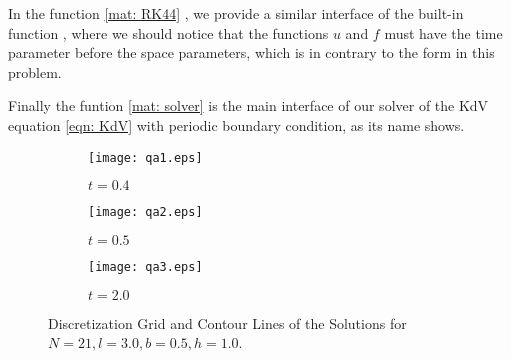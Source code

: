 \documentclass{assignment}[2019/10/15]
\begin{document}

    In the function \ref{mat: RK44} , we provide a similar interface of the built-in function , where we should notice that the functions $u$ and $f$ must have the time parameter before the space parameters, which is in contrary to the form in this problem.


    Finally the funtion \ref{mat: solver}  is the main interface of our solver of the KdV equation \ref{eqn: KdV} with periodic boundary condition, as its name shows.


    \begin{figure}[htb]
        \begin{subfigure}[b]{0.3\textwidth}
            \centering
            \texttt{[image: qa1.eps]}
            \caption{$t=0.4$}
        \end{subfigure}
        \hfill
        \begin{subfigure}[b]{0.3\textwidth}
            \centering
            \texttt{[image: qa2.eps]}
            \caption{$t=0.5$}
        \end{subfigure}
        \hfill
        \begin{subfigure}[b]{0.3\textwidth}
            \centering
            \texttt{[image: qa3.eps]}
            \caption{$t=2.0$}
        \end{subfigure}
        \caption{Discretization Grid and Contour Lines of the Solutions for $N = 21, l = 3.0, b = 0.5, h = 1.0$.}
        \label{fig: qa}
    \end{figure}
\end{document}
